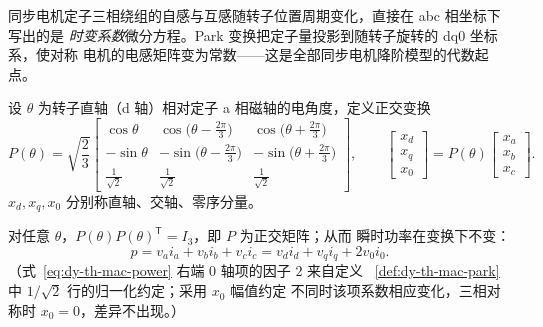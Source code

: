 同步电机定子三相绕组的自感与互感随转子位置周期变化，直接在 abc 相坐标下写出的是
\emph{时变系数}微分方程。Park 变换把定子量投影到随转子旋转的 dq0 坐标系，使对称
电机的电感矩阵变为常数——这是全部同步电机降阶模型的代数起点。

\begin{definition}\label{def:dy-th-mac-park}
设 $\theta$ 为转子直轴（d 轴）相对定子 a 相磁轴的电角度，定义正交变换
\begin{equation}
P(\theta)=\sqrt{\frac{2}{3}}
\begin{bmatrix}
\cos\theta & \cos\bigl(\theta-\tfrac{2\pi}{3}\bigr) & \cos\bigl(\theta+\tfrac{2\pi}{3}\bigr)\\[1ex]
-\sin\theta & -\sin\bigl(\theta-\tfrac{2\pi}{3}\bigr) & -\sin\bigl(\theta+\tfrac{2\pi}{3}\bigr)\\[1ex]
\tfrac{1}{\sqrt2} & \tfrac{1}{\sqrt2} & \tfrac{1}{\sqrt2}
\end{bmatrix},
\qquad
\begin{bmatrix}x_d\\x_q\\x_0\end{bmatrix}=P(\theta)\begin{bmatrix}x_a\\x_b\\x_c\end{bmatrix}.
\label{eq:dy-th-mac-park}
\end{equation}
$x_d,x_q,x_0$ 分别称直轴、交轴、零序分量。
\end{definition}

\begin{proposition}[$P$ 的正交性与功率不变性]\label{prop:dy-th-mac-orth}
对任意 $\theta$，$P(\theta)P(\theta)^{\mathsf T}=I_3$，即 $P$ 为正交矩阵；从而
瞬时功率在变换下不变：
\begin{equation}
p=v_ai_a+v_bi_b+v_ci_c=v_di_d+v_qi_q+2v_0i_0 .
\label{eq:dy-th-mac-power}
\end{equation}
（式~\eqref{eq:dy-th-mac-power} 右端 $0$ 轴项的因子 $2$ 来自定义
~\ref{def:dy-th-mac-park} 中 $1/\sqrt2$ 行的归一化约定；采用 $x_0$ 幅值约定
不同时该项系数相应变化，三相对称时 $x_0=0$，差异不出现。）
\end{proposition}

